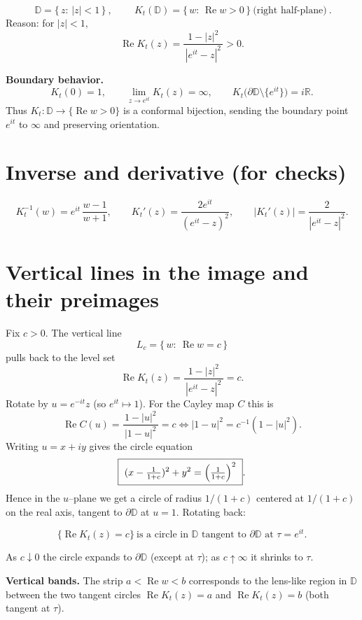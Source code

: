 \documentclass[11pt]{article}
\begin{document}
	\[
	\boxed{\ \mathbb{D}=\{\,z:\,|z|<1\,\}\ },
	\qquad
	\boxed{\ K_t(\mathbb{D})=\{\,w:\,\operatorname{Re} w>0\,\}\ \text{(right half-plane)}\ }.
	\]
	Reason: for $|z|<1$,
	\[
	\operatorname{Re} K_t(z)=\frac{1-|z|^2}{\,|e^{it}-z|^2\,}>0.
	\]
	
	\medskip
	
	\textbf{Boundary behavior.}
	\[
	K_t(0)=1,\qquad
	\lim_{z\to e^{it}}K_t(z)=\infty,\qquad
	K_t\!\big(\partial\mathbb{D}\setminus\{e^{it}\}\big)=i\mathbb{R}.
	\]
	Thus $K_t:\mathbb{D}\to\{\operatorname{Re} w>0\}$ is a conformal bijection, sending the boundary point $e^{it}$ to $\infty$ and preserving orientation.
	
	\section*{Inverse and derivative (for checks)}
	
	\[
	K_t^{-1}(w)=e^{it}\,\frac{w-1}{w+1},
	\qquad
	K_t'(z)=\frac{2e^{it}}{(e^{it}-z)^2},
	\qquad
	\bigl|K_t'(z)\bigr|=\frac{2}{|e^{it}-z|^2}.
	\]
	
	\section*{Vertical lines in the image and their preimages}
	
	Fix $c>0$. The vertical line 
	\[
	L_c=\{\,w:\ \operatorname{Re} w=c\,\}
	\]
	pulls back to the level set
	\[
	\operatorname{Re} K_t(z)=\frac{1-|z|^2}{\,|e^{it}-z|^2\,}=c.
	\]
	Rotate by $u=e^{-it}z$ (so $e^{it}\mapsto 1$). For the Cayley map $C$ this is
	\[
	\operatorname{Re} C(u)=\frac{1-|u|^2}{\,|1-u|^2\,}=c
	\iff
	|1-u|^2=c^{-1}(1-|u|^2).
	\]
	Writing $u=x+iy$ gives the circle equation
	\[
	\boxed{\ (x-\tfrac{1}{1+c})^2+y^2=\Bigl(\tfrac{1}{1+c}\Bigr)^2\ }.
	\]
	Hence in the $u$–plane we get a circle of radius $1/(1+c)$ centered at $1/(1+c)$ on the real axis, tangent to $\partial\mathbb{D}$ at $u=1$. Rotating back:
	
	\[
	\boxed{\ \{\operatorname{Re} K_t(z)=c\}\ \text{is a circle in }\mathbb{D}\text{ tangent to }\partial\mathbb{D}\text{ at }\tau=e^{it}. \ }
	\]
	
	As $c\downarrow 0$ the circle expands to $\partial\mathbb{D}$ (except at $\tau$); as $c\uparrow\infty$ it shrinks to $\tau$.
	
	\medskip
	
	\textbf{Vertical bands.}
	The strip $a<\operatorname{Re} w<b$ corresponds to the lens-like region in $\mathbb{D}$
	between the two tangent circles $\operatorname{Re} K_t(z)=a$ and $\operatorname{Re} K_t(z)=b$ (both tangent at $\tau$).
	
\end{document}
